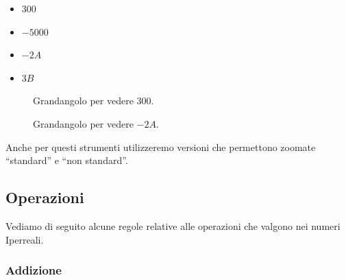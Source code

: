 \begin{multicols}{4}
\begin{itemize}[nosep]
 \item $300$
 \item $-5000$
 \item $-2A$
 \item $3B$
\end{itemize}
\end{multicols}
\vspace{-5mm}
\begin{figure}[h]
\begin{inaccessibleblock}

\begin{minipage}{.48\linewidth}
 \begin{center}
\grandangoloa
 \end{center}
\caption{Grandangolo per vedere \(300\).} \label{fig:grandangoloa}
\end{minipage}
\hfill
\begin{minipage}{.48\linewidth}
 \begin{center}
\grandangolob
 \end{center}
\caption{Grandangolo per vedere \(-2A\).} \label{fig:grandangolob}
\end{minipage}

\end{inaccessibleblock}
\end{figure}

Anche per questi strumenti utilizzeremo versioni che permettono zoomate 
``standard'' e ``non standard''.

\subsection{Operazioni}
\label{subsec:insnum_operazioni}

Vediamo di seguito alcune regole relative alle operazioni 
che valgono nei numeri Iperreali.

\subsubsection{Addizione}
\label{subsec:insnum_addizione}

